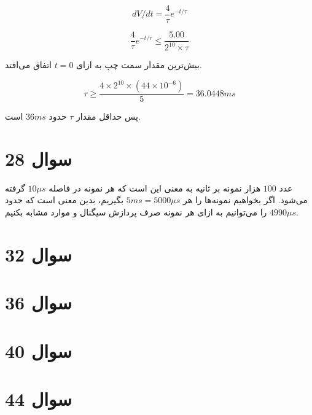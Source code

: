\documentclass[12pt]{article}
\begin{document}
$$dV/dt = \frac{4}{\tau} e^{-t/\tau}$$

$$\frac{4}{\tau} e^{-t / \tau} \leq \frac{5.00}{2^{10} \times \tau}$$

بیش‌ترین مقدار سمت چپ به ازای $t=0$ اتفاق می‌افتد.

$$\tau \geq \frac{4 \times 2^{10} \times (44 \times 10^{-6})}{5} = 36.0448 ms$$

پس حداقل مقدار $\tau$ حدود $36ms$ است.



\section*{سوال 28}

عدد $100$ هزار نمونه بر ثانیه به معنی این است که هر نمونه در فاصله $10 \mu s$ گرفته می‌شود. اگر بخواهیم نمونه‌ها را هر $5ms = 5000 \mu s$ بگیریم، بدین معنی است که حدود $4990 \mu s$ را می‌توانیم به ازای هر نمونه صرف پردازش سیگنال و موارد مشابه بکنیم.



\section*{سوال 32}


\section*{سوال 36}


\section*{سوال 40}

\section*{سوال 44}

 
\end{document}
